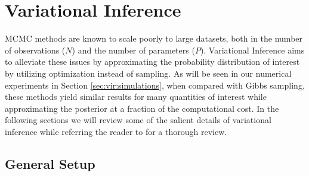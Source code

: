 \documentclass[]{article}
\begin{document}
\section{Variational Inference} \label{sec:vir:vi}

MCMC methods are known to scale poorly to large datasets, both in the number of
observations ($N$) and the number of parameters ($P$).  Variational Inference
\citep{vbreview, bishop2006pattern, murphy2012} aims to alleviate these issues
by approximating the probability distribution of interest by utilizing
optimization instead of sampling. As will be seen in our numerical experiments
in Section \ref{sec:vir:simulations}, when compared with Gibbs sampling, these
methods yield similar results for many quantities of interest while
approximating the posterior at a fraction of the computational cost. In the
following sections we will review some of the salient details of variational
inference while referring the reader to \citet{vbreview, hoffman2013svi,
bishop2006pattern, murphy2012} for a thorough review.

\subsection{General Setup}
\end{document}
